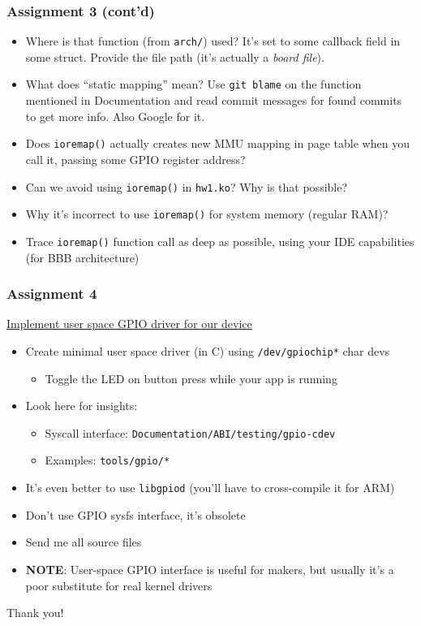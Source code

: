 \documentclass[aspectratio=169,usenames,dvipsnames]{beamer}
\newcounter{cont}
\begin{document}
\begin{frame}
  \frametitle{Assignment 3 (cont'd)}
  \begin{itemize}
    \item Where is that function (from \texttt{arch/}) used? It's set to some
          callback field in some struct. Provide the file path (it's actually
          a \textit{board file}).
    \item What does ``static mapping'' mean? Use \texttt{git blame} on the
          function mentioned in Documentation and read commit messages for found
          commits to get more info. Also Google for it.
    \item Does \texttt{ioremap()} actually creates new MMU mapping in page table
          when you call it, passing some GPIO register address?
    \item Can we avoid using \texttt{ioremap()} in \texttt{hw1.ko}? Why is that
          possible?
    \item Why it's incorrect to use \texttt{ioremap()} for system memory
          (regular RAM)?
  \item Trace \texttt{ioremap()} function call as deep as possible, using your
        IDE capabilities (for BBB architecture)
  \end{itemize}
\end{frame}

\begin{frame}
  \frametitle{Assignment 4}
  \underline{Implement user space GPIO driver for our device}
  \begin{itemize}
    \item Create minimal user space driver (in C) using
          \texttt{/dev/gpiochip*} char devs
      \begin{itemize}
        \item Toggle the LED on button press while your app is running
      \end{itemize}
    \item Look here for insights:
      \begin{itemize}
        \item Syscall interface: \texttt{Documentation/ABI/testing/gpio-cdev}
        \item Examples: \texttt{tools/gpio/*}
      \end{itemize}
    \item It's even better to use \texttt{libgpiod} (you'll have to
          cross-compile it for ARM)
    \item Don't use GPIO sysfs interface, it's obsolete
    \item Send me all source files
    \item \textbf{NOTE}: User-space GPIO interface is useful for makers, but
          usually it's a poor substitute for real kernel drivers
  \end{itemize}
\end{frame}

\begin{frame}[standout]
  Thank you!
\end{frame}
\end{document}
